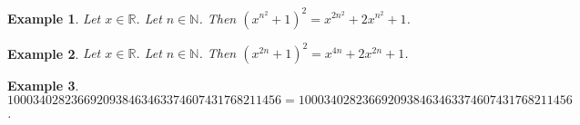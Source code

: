 \documentclass{article}
\newtheorem{example}{Example}
\begin{document}
\begin{example}
Let $x\in\mathbb{R}$. Let $n\in\mathbb{N}$. Then ${(x^{n^2}+1)}^2=x^{2n^2}+2x^{n^2}+1$.
\end{example}

\begin{example}
Let $x\in\mathbb{R}$. Let $n\in\mathbb{N}$. Then ${(x^{2n}+1)}^2=x^{4n}+2x^{2n}+1$.
\end{example}

\begin{example}
    $1000340282366920938463463374607431768211456=1000340282366920938463463374607431768211456$.
\end{example}
\end{document}
